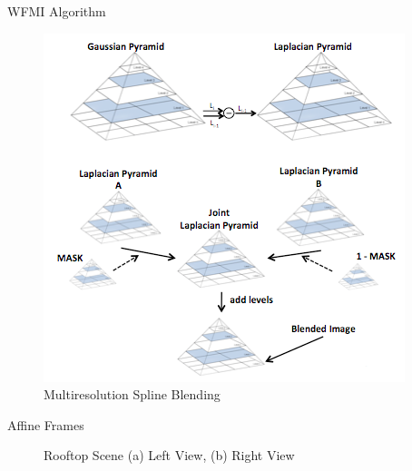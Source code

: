 \documentclass{beamer}
\begin{document}
\begin{frame}[c]{\sc WFMI Algorithm}

\begin{figure}[!h]
\centering
\includegraphics[height=.7\textheight]{MultiresolutionSpline}
\caption{Multiresolution Spline Blending \cite{Burt1983}}
\label{MultiresolutionSpline}
\end{figure}

\end{frame}







\begin{frame}[c]{\sc Affine Frames}

\begin{figure}[!h]
\centering
{}
\caption{Rooftop Scene (a) Left View, (b) Right View}
\label{RooftopImages}
\end{figure}

\end{frame}
\end{document}
